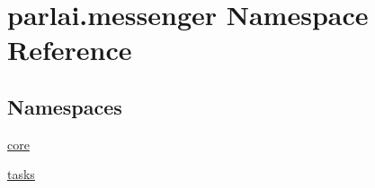 \hypertarget{namespaceparlai_1_1messenger}{}\section{parlai.\+messenger Namespace Reference}
\label{namespaceparlai_1_1messenger}
\subsection*{Namespaces}
\begin{DoxyCompactItemize}
\item 
 \hyperlink{namespaceparlai_1_1messenger_1_1core}{core}
\item 
 \hyperlink{namespaceparlai_1_1messenger_1_1tasks}{tasks}
\end{DoxyCompactItemize}
